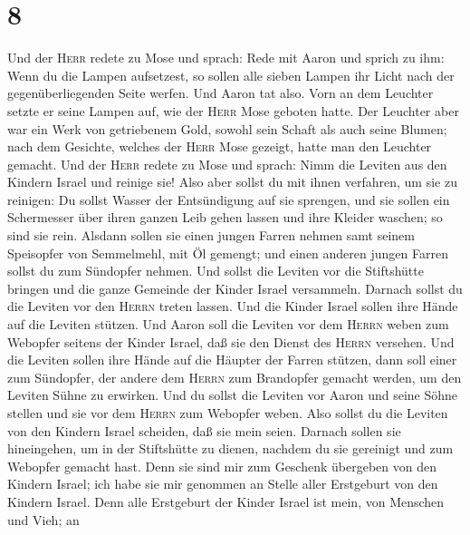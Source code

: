 \hypertarget{section-7}{%
\section{8}\label{section-7}}

 Und der \textsc{Herr} redete zu Mose und sprach: Rede mit
Aaron und sprich zu ihm:  Wenn du die Lampen aufsetzest,
so sollen alle sieben Lampen ihr Licht nach der gegenüberliegenden Seite
werfen.  Und Aaron tat also. Vorn an dem Leuchter setzte
er seine Lampen auf, wie der \textsc{Herr} Mose geboten hatte.
 Der Leuchter aber war ein Werk von getriebenem Gold,
sowohl sein Schaft als auch seine Blumen; nach dem Gesichte, welches der
\textsc{Herr} Mose gezeigt, hatte man den Leuchter gemacht.
 Und der \textsc{Herr} redete zu Mose und sprach:
 Nimm die Leviten aus den Kindern Israel und reinige sie!
 Also aber sollst du mit ihnen verfahren, um sie zu
reinigen: Du sollst Wasser der Entsündigung auf sie sprengen, und sie
sollen ein Schermesser über ihren ganzen Leib gehen lassen und ihre
Kleider waschen; so sind sie rein.  Alsdann sollen sie
einen jungen Farren nehmen samt seinem Speisopfer von Semmelmehl, mit Öl
gemengt; und einen anderen jungen Farren sollst du zum Sündopfer nehmen.
 Und sollst die Leviten vor die Stiftshütte bringen und
die ganze Gemeinde der Kinder Israel versammeln.  Darnach
sollst du die Leviten vor den \textsc{Herrn} treten lassen. Und die
Kinder Israel sollen ihre Hände auf die Leviten stützen. 
Und Aaron soll die Leviten vor dem \textsc{Herrn} weben zum Webopfer
seitens der Kinder Israel, daß sie den Dienst des \textsc{Herrn}
versehen.  Und die Leviten sollen ihre Hände auf die
Häupter der Farren stützen, dann soll einer zum Sündopfer, der andere
dem \textsc{Herrn} zum Brandopfer gemacht werden, um den Leviten Sühne
zu erwirken.  Und du sollst die Leviten vor Aaron und
seine Söhne stellen und sie vor dem \textsc{Herrn} zum Webopfer weben.
 Also sollst du die Leviten von den Kindern Israel
scheiden, daß sie mein seien.  Darnach sollen sie
hineingehen, um in der Stiftshütte zu dienen, nachdem du sie gereinigt
und zum Webopfer gemacht hast.  Denn sie sind mir zum
Geschenk übergeben von den Kindern Israel; ich habe sie mir genommen an
Stelle aller Erstgeburt von den Kindern Israel.  Denn
alle Erstgeburt der Kinder Israel ist mein, von Menschen und Vieh; an
